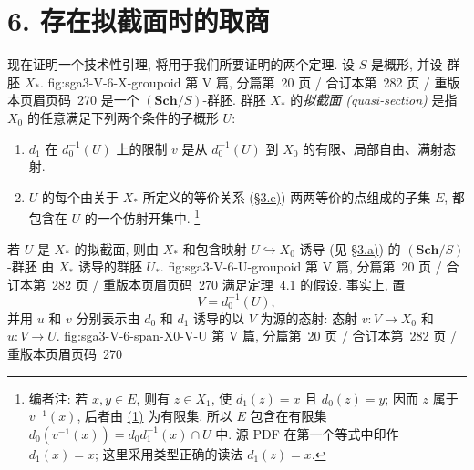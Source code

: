 
\section*{6. 存在拟截面时的取商}
\label{sec:sga3-V-6}

现在证明一个技术性引理, 将用于我们所要证明的两个定理.
设 \(S\) 是概形, 并设
  {群胚 \(X_\ast\).}
  {fig:sga3-V-6-X-groupoid}
  {第 V 篇, 分篇第~20 页 / 合订本第~282 页 / 重版本页眉页码~270}
是一个 \((\mathbf{Sch}/S)\)-群胚.
群胚 \(X_\ast\) 的\emph{拟截面 (quasi-section)} 是指
\(X_0\) 的任意满足下列两个条件的子概形 \(U\):
\begin{enumerate}
\item[(1)]\label{def:sga3-V-6-quasisection-1}%
  \(d_1\) 在 \(d_0^{-1}(U)\) 上的限制 \(v\)
  是从 \(d_0^{-1}(U)\) 到 \(X_0\) 的有限、局部自由、满射态射.
\item[(2)]\label{def:sga3-V-6-quasisection-2}%
  \(U\) 的每个由关于 \(X_\ast\) 所定义的等价关系
  (\hyperref[par:sga3-V-3-e]{\S3.e)}) 两两等价的点组成的子集 \(E\),
  都包含在 \(U\) 的一个仿射开集中.
  \footnote{\label{note:sga3-V-31}编者注: 若 \(x,y\in E\),
  则有 \(z\in X_1\), 使 \(d_1(z)=x\) 且 \(d_0(z)=y\);
  因而 \(z\) 属于 \(v^{-1}(x)\), 后者由
  \hyperref[def:sga3-V-6-quasisection-1]{(1)} 为有限集.
  所以 \(E\) 包含在有限集
  \(d_0(v^{-1}(x))=d_0d_1^{-1}(x)\cap U\) 中.
  源 PDF 在第一个等式中印作 \(d_1(x)=x\);
  这里采用类型正确的读法 \(d_1(z)=x\).}
\end{enumerate}

若 \(U\) 是 \(X_\ast\) 的拟截面, 则由 \(X_\ast\)
和包含映射 \(U\hookrightarrow X_0\) 诱导
(见 \hyperref[par:sga3-V-3-a]{\S3.a)}) 的
\((\mathbf{Sch}/S)\)-群胚
  {由 \(X_\ast\) 诱导的群胚 \(U_\ast\).}
  {fig:sga3-V-6-U-groupoid}
  {第 V 篇, 分篇第~20 页 / 合订本第~282 页 / 重版本页眉页码~270}
满足定理~\hyperref[thm:sga3-V-4.1]{4.1} 的假设. 事实上, 置
\[
  V=d_0^{-1}(U),
\]
并用 \(u\) 和 \(v\) 分别表示由 \(d_0\) 和 \(d_1\)
诱导的以 \(V\) 为源的态射:
  {态射 \(v:V\to X_0\) 和 \(u:V\to U\).}
  {fig:sga3-V-6-span-X0-V-U}
  {第 V 篇, 分篇第~20 页 / 合订本第~282 页 / 重版本页眉页码~270}

